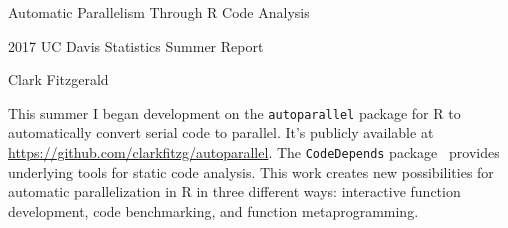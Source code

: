 \documentclass[12pt]{article}
\begin{document}
%
%
%
%
%

\begin{center}
    \large Automatic Parallelism Through R Code Analysis 

    \normalsize 2017 UC Davis Statistics Summer Report
    
    Clark Fitzgerald
\end{center}

\hfill

This summer I began development on the \texttt{autoparallel} package for R
to automatically convert serial code to parallel. It's publicly available
at \url{https://github.com/clarkfitzg/autoparallel}. The \texttt{CodeDepends}
package~\cite{R-CodeDepends}
provides underlying tools for static code analysis.
This work creates new possibilities for automatic parallelization in R in
three different ways: interactive function development, code benchmarking,
and function metaprogramming.
\end{document}
